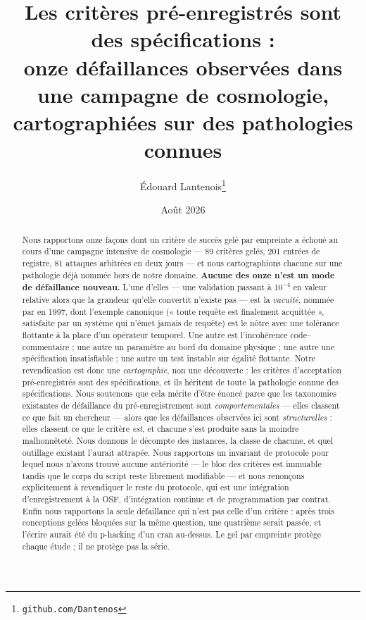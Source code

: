 \documentclass[11pt,a4paper]{article}
\title{\bf Les critères pré-enregistrés sont des spécifications :\\
onze défaillances observées dans une campagne de cosmologie,\\
cartographiées sur des pathologies connues}
\author{Édouard Lantenois\thanks{\texttt{github.com/Dantenos}}}
\date{Août 2026}
\begin{document}
\maketitle

\begin{abstract}
\noindent
Nous rapportons onze façons dont un critère de succès gelé par empreinte a échoué au cours
d'une campagne intensive de cosmologie --- 89 critères gelés, 201 entrées de registre, 81
attaques arbitrées en deux jours --- et nous cartographions chacune sur une pathologie déjà
nommée hors de notre domaine. \textbf{Aucune des onze n'est un mode de défaillance nouveau.}
L'une d'elles --- une validation passant à $10^{-4}$ en valeur relative alors que la grandeur
qu'elle convertit n'existe pas --- est la \emph{vacuité}, nommée par \citet{beer1997} en 1997,
dont l'exemple canonique (« toute requête est finalement acquittée », satisfaite par un
système qui n'émet jamais de requête) est le nôtre avec une tolérance flottante à la place
d'un opérateur temporel. Une autre est l'incohérence code--commentaire ; une autre un
paramètre au bord du domaine physique \citep{feldman1998} ; une autre une spécification
insatisfiable ; une autre un test instable sur égalité flottante. Notre revendication est
donc une \emph{cartographie}, non une découverte : les critères d'acceptation
pré-enregistrés sont des spécifications, et ils héritent de toute la pathologie connue des
spécifications. Nous soutenons que cela mérite d'être énoncé parce que les taxonomies
existantes de défaillance du pré-enregistrement \citep{yamada2018,bakker2020} sont
\emph{comportementales} --- elles classent ce que fait un chercheur --- alors que les
défaillances observées ici sont \emph{structurelles} : elles classent ce que le critère
\emph{est}, et chacune s'est produite sans la moindre malhonnêteté. Nous donnons le décompte
des instances, la classe de chacune, et quel outillage existant l'aurait attrapée. Nous
rapportons un invariant de protocole pour lequel nous n'avons trouvé aucune antériorité ---
le bloc des critères est immuable tandis que le corps du script reste librement modifiable
--- et nous renonçons explicitement à revendiquer le reste du protocole, qui est une
intégration d'enregistrement à la OSF, d'intégration continue \citep{bj2017} et de
programmation par contrat. Enfin nous rapportons la seule défaillance qui n'est pas celle
d'un critère : après trois conceptions gelées bloquées sur la même question, une quatrième
serait passée, et l'écrire aurait été du p-hacking d'un cran au-dessus. Le gel par empreinte
protège chaque étude ; il ne protège pas la série.
\end{abstract}
\end{document}
